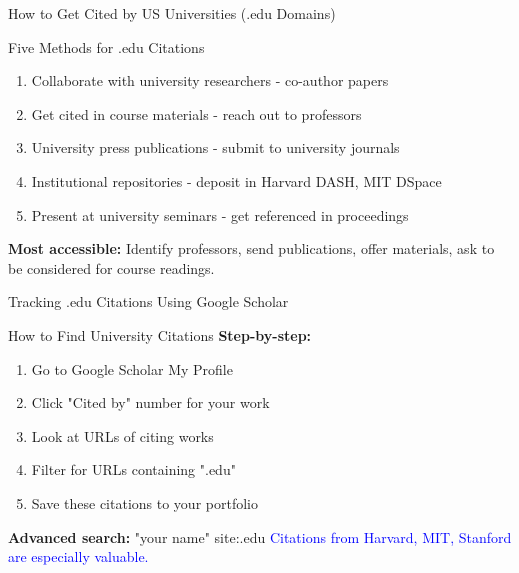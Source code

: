 \documentclass[11pt]{beamer}
\begin{document}
	\begin{frame}{How to Get Cited by US Universities (.edu Domains)}
		\small
		\begin{block}{Five Methods for .edu Citations}
			\begin{enumerate}
				\item Collaborate with university researchers - co-author papers
				\item Get cited in course materials - reach out to professors
				\item University press publications - submit to university journals
				\item Institutional repositories - deposit in Harvard DASH, MIT DSpace
				\item Present at university seminars - get referenced in proceedings
			\end{enumerate}
			\textbf{Most accessible:} Identify professors, send publications, offer materials, ask to be considered for course readings.
		\end{block}
	\end{frame}
	
	\begin{frame}{Tracking .edu Citations Using Google Scholar}
		\small
		\begin{block}{How to Find University Citations}
			\textbf{Step-by-step:}
			\begin{enumerate}
				\item Go to Google Scholar My Profile
				\item Click "Cited by" number for your work
				\item Look at URLs of citing works
				\item Filter for URLs containing ".edu"
				\item Save these citations to your portfolio
			\end{enumerate}
			\textbf{Advanced search:} "your name" site:.edu
			\vspace{0.2cm}
			\textcolor{blue}{Citations from Harvard, MIT, Stanford are especially valuable.}
		\end{block}
	\end{frame}
	
	
\end{document}
